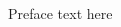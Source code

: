 \chapter*{\prefacename}\label{ch:preface}

Preface text here

\begin{multicols}{2}
  \centering
  \signature{\authorA}{\emaillinkA}
  \vspace{3\baselineskip}
  \signature{\authorB}{\emaillinkB}
  \vspace{3\baselineskip}
  \signature{\authorC}{\emaillinkC}
  \vspace{3\baselineskip}
  \signature{\authorD}{\emaillinkD}
  \columnbreak
  \signature{\authorE}{\emaillinkE}
  \vspace{3\baselineskip}
  \signature{\authorF}{\emaillinkF}
  \vspace{3\baselineskip}
  \signature{\authorG}{\emaillinkG}
  \vspace{3\baselineskip}
  \signature{\authorH}{\emaillinkH}
\end{multicols}
